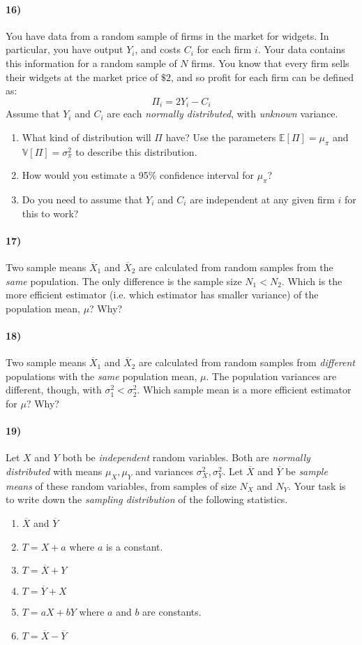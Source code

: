 \documentclass[12pt]{article}
\newcommand\ov{\overline}
\newcommand\BB{\mathbb}
\newcommand\EE{\mathbb{E}}
\numberwithin{equation}{section}
\numberwithin{figure}{section}
\numberwithin{table}{section}
\begin{document}
\paragraph{16)} You have data from a random sample of firms in the market for widgets. In particular, you have output $Y_i$, and costs $C_i$ for each firm $i$. Your data contains this information for a random sample of $N$ firms. You know that every firm sells their widgets at the market price of $\$2$, and so profit for each firm can be defined as:
\[\Pi_i = 2 Y_i - C_i\]
Assume that $Y_i$ and $C_i$ are each \emph{normally distributed}, with \emph{unknown} variance.
\begin{enumerate}
\item What kind of distribution will $\Pi$ have? Use the parameters $\EE[\Pi] = \mu_\pi$ and $\BB{V}[\Pi]=\sigma^2_\pi$ to describe this distribution.
\item How would you estimate a 95\% confidence interval for $\mu_\pi$?
\item Do you need to assume that $Y_i$ and $C_i$ are independent at any given firm $i$ for this to work?
\end{enumerate}

\paragraph{17)} Two sample means $\ov{X}_1$ and $\ov{X}_2$ are calculated from random samples from the \emph{same} population. The only difference is the sample size $N_1<N_2$. Which is the more efficient estimator (i.e. which estimator has smaller variance) of the population mean, $\mu$? Why?

\paragraph{18)} Two sample means $\ov{X}_1$ and $\ov{X}_2$ are calculated from random samples from \emph{different} populations with the \emph{same} population mean, $\mu$. The population variances are different, though, with $\sigma^2_1<\sigma^2_2$. Which sample mean is a more efficient estimator for $\mu$? Why?

\paragraph{19)} Let $X$ and $Y$ both be \emph{independent} random variables. Both are \emph{normally distributed} with means $\mu_X,\mu_Y$ and variances $\sigma^2_X,\sigma^2_Y$. Let $\ov{X}$ and $\ov{Y}$ be \emph{sample means} of these random variables, from samples of size $N_X$ and $N_Y$. Your task is to write down the \emph{sampling distribution} of the following statistics.
\begin{enumerate}
\item $\ov{X}$ and $\ov{Y}$
\item $T=X+a$ where $a$ is a constant.
\item $T=\ov{X}+Y$
\item $T=\ov{Y}+X$
\item $T=aX + bY$ where $a$ and $b$ are constants.
\item $T=\ov{X}-\ov{Y}$
\end{enumerate}
\end{document}
